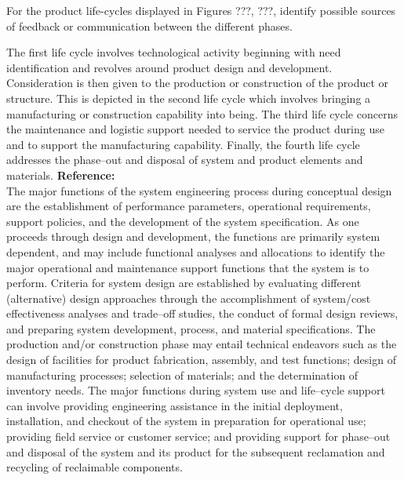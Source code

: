 \begin{exercises}
    \begin{exercise}
    \label{sea-2-11}
        For the product life-cycles displayed in Figures ???, ???, identify possible sources of feedback or communication between the different phases.
    \end{exercise}
    \begin{solution}
        The first life cycle involves technological activity beginning with need identification and revolves around product design and development. Consideration is then given to the production or construction of the product or structure. This is depicted in the second life cycle which involves bringing a manufacturing or construction capability into being. The third life cycle concerns the maintenance and logistic support needed to service the product during use and to support the manufacturing capability. Finally, the fourth life cycle addresses the phase–out and disposal of system and product elements and materials. \textbf{Reference:}\\
        The major functions of the system engineering process during conceptual design are the establishment of performance parameters, operational requirements, support policies, and the development of the system specification. As one proceeds through design and development, the functions are primarily system dependent, and may include functional analyses and allocations to identify the major operational and maintenance support functions that the system is to perform. Criteria for system design are established by evaluating different (alternative) design approaches through the accomplishment of system/cost effectiveness analyses and trade–off studies, the conduct of formal design reviews, and preparing system development, process, and material specifications. The production and/or construction phase may entail technical endeavors such as the design of facilities for product fabrication, assembly, and test functions; design of manufacturing processes; selection of materials; and the determination of inventory needs. The major functions during system use and life–cycle support can involve providing engineering assistance in the initial deployment, installation, and checkout of the system in preparation for operational use; providing field service or customer service; and providing support for phase–out and disposal of the system and its product for the subsequent reclamation and recycling of reclaimable components.
    \end{solution}
    

\end{exercises}
